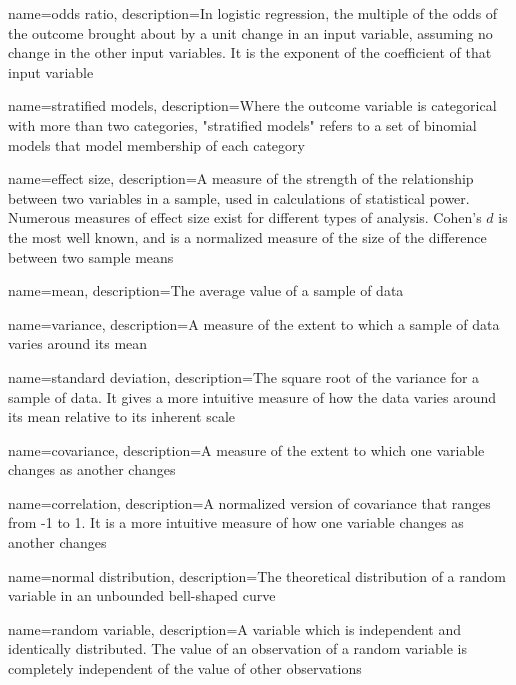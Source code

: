 {
    name={odds ratio},
    description={In logistic regression, the multiple of the odds of the outcome brought about by a unit change in an input variable, assuming no change in the other input variables.  It is the exponent of the coefficient of that input variable}
}

{
    name={stratified models},
    description={Where the outcome variable is categorical with more than two categories, "stratified models" refers to a set of binomial models that model membership of each category}
}

{
    name={effect size},
    description={A measure of the strength of the relationship between two variables in a sample, used in calculations of statistical power.  Numerous measures of effect size exist for different types of analysis.  Cohen's $d$ is the most well known, and is a normalized measure of the size of the difference between two sample means}
}

{
    name={mean},
    description={The average value of a sample of data}
}

{
    name={variance},
    description={A measure of the extent to which a sample of data varies around its mean}
}

{
    name={standard deviation},
    description={The square root of the variance for a sample of data.  It gives a more intuitive measure of how the data varies around its mean relative to its inherent scale}
}

{
    name={covariance},
    description={A measure of the extent to which one variable changes as another changes}
}

{
    name={correlation},
    description={A normalized version of covariance that ranges from -1 to 1.  It is a more intuitive measure of how one variable changes as another changes}
}

{
    name={normal distribution},
    description={The theoretical distribution of a random variable in an unbounded bell-shaped curve}
}

{
    name={random variable},
    description={A variable which is independent and identically distributed.  The value of an observation of a random variable is completely independent of the value of other observations}
}

